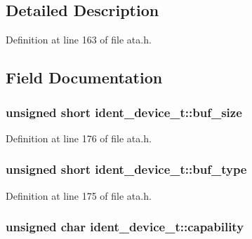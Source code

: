 \subsection{Detailed Description}


Definition at line 163 of file ata.\+h.



\subsection{Field Documentation}
\subsubsection[{\texorpdfstring{buf\+\_\+size}{buf_size}}]{\setlength{\rightskip}{0pt plus 5cm}unsigned short ident\+\_\+device\+\_\+t\+::buf\+\_\+size}\hypertarget{structident__device__t_a2b96de1287d6347279fb208225262974}{}\label{structident__device__t_a2b96de1287d6347279fb208225262974}


Definition at line 176 of file ata.\+h.

\subsubsection[{\texorpdfstring{buf\+\_\+type}{buf_type}}]{\setlength{\rightskip}{0pt plus 5cm}unsigned short ident\+\_\+device\+\_\+t\+::buf\+\_\+type}\hypertarget{structident__device__t_aa631ed68393ce9dcc8dfac663441a14d}{}\label{structident__device__t_aa631ed68393ce9dcc8dfac663441a14d}


Definition at line 175 of file ata.\+h.

\subsubsection[{\texorpdfstring{capability}{capability}}]{\setlength{\rightskip}{0pt plus 5cm}unsigned char ident\+\_\+device\+\_\+t\+::capability}\hypertarget{structident__device__t_a7d02a0251de92f8bfcde9254fae00d51}{}\label{structident__device__t_a7d02a0251de92f8bfcde9254fae00d51}


